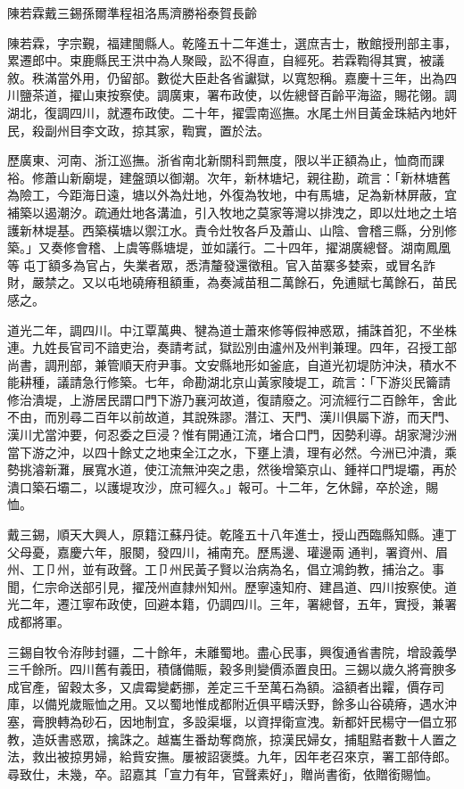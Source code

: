 
\begin{pinyinscope}
陳若霖戴三錫孫爾準程祖洛馬濟勝裕泰賀長齡

陳若霖，字宗覲，福建閩縣人。乾隆五十二年進士，選庶吉士，散館授刑部主事，累遷郎中。束鹿縣民王洪中為人聚毆，訟不得直，自經死。若霖鞫得其實，被議敘。秩滿當外用，仍留部。數從大臣赴各省讞獄，以寬恕稱。嘉慶十三年，出為四川鹽茶道，擢山東按察使。調廣東，署布政使，以佐總督百齡平海盜，賜花翎。調湖北，復調四川，就遷布政使。二十年，擢雲南巡撫。水尾土州目黃金珠結內地奸民，殺副州目李文政，掠其家，鞫實，置於法。

歷廣東、河南、浙江巡撫。浙省南北新關科罰無度，限以半正額為止，恤商而課裕。修蕭山新廟堤，建盤頭以御潮。次年，新林塘圮，親往勘，疏言：「新林塘舊為險工，今距海日遠，塘以外為灶地，外復為牧地，中有馬塘，足為新林屏蔽，宜補築以遏潮汐。疏通灶地各溝洫，引入牧地之莫家等灣以排洩之，即以灶地之土培護新林堤基。西築橫塘以禦江水。責令灶牧各戶及蕭山、山陰、會稽三縣，分別修築。」又奏修會稽、上虞等縣塘堤，並如議行。二十四年，擢湖廣總督。湖南鳳凰等屯丁額多為官占，失業者眾，悉清釐發還徵租。官入苗寨多婪索，或冒名詐財，嚴禁之。又以屯地磽瘠租額重，為奏減苗租二萬餘石，免逋賦七萬餘石，苗民感之。

道光二年，調四川。中江覃萬典、犍為道士蕭來修等假神惑眾，捕誅首犯，不坐株連。九姓長官司不諳吏治，奏請考試，獄訟別由瀘州及州判兼理。四年，召授工部尚書，調刑部，兼管順天府尹事。文安縣地形如釜底，自道光初堤防沖決，積水不能耕種，議請急行修築。七年，命勘湖北京山黃家陵堤工，疏言：「下游災民籥請修治潰堤，上游居民謂口門下游乃襄河故道，復請廢之。河流經行二百餘年，舍此不由，而別尋二百年以前故道，其說殊謬。潛江、天門、漢川俱屬下游，而天門、漢川尤當沖要，何忍委之巨浸？惟有開通江流，堵合口門，因勢利導。胡家灣沙洲當下游之沖，以四十餘丈之地束全江之水，下壅上潰，理有必然。今洲已沖潰，乘勢挑濬新灘，展寬水道，使江流無沖突之患，然後增築京山、鍾祥口門堤壩，再於潰口築石壩二，以護堤攻沙，庶可經久。」報可。十二年，乞休歸，卒於途，賜恤。

戴三錫，順天大興人，原籍江蘇丹徒。乾隆五十八年進士，授山西臨縣知縣。連丁父母憂，嘉慶六年，服闋，發四川，補南充。歷馬邊、瓘邊兩通判，署資州、眉州、工⼙州，並有政聲。工⼙州民黃子賢以治病為名，倡立鴻鈞教，捕治之。事聞，仁宗命送部引見，擢茂州直隸州知州。歷寧遠知府、建昌道、四川按察使。道光二年，遷江寧布政使，回避本籍，仍調四川。三年，署總督，五年，實授，兼署成都將軍。

三錫自牧令洊陟封疆，二十餘年，未離蜀地。盡心民事，興復通省書院，增設義學三千餘所。四川舊有義田，積儲備賑，穀多則變價添置良田。三錫以歲久將膏腴多成官產，留穀太多，又虞霉變虧挪，差定三千至萬石為額。溢額者出糶，價存司庫，以備兇歲賑恤之用。又以蜀地惟成都附近俱平疇沃野，餘多山谷磽瘠，遇水沖塞，膏腴轉為砂石，因地制宜，多設渠堰，以資捍衛宣洩。新都奸民楊守一倡立邪教，造妖書惑眾，擒誅之。越巂生番劫奪商旅，掠漢民婦女，捕駔黠者數十人置之法，救出被掠男婦，給貲安撫。屢被詔褒獎。九年，因年老召來京，署工部侍郎。尋致仕，未幾，卒。詔嘉其「宣力有年，官聲素好」，贈尚書銜，依贈銜賜恤。


\end{pinyinscope}
